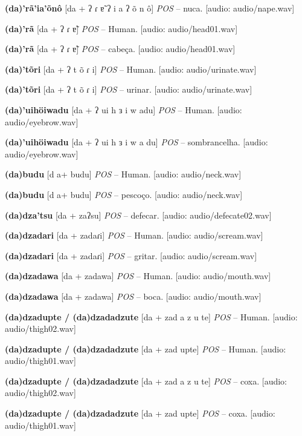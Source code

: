 \textbf{(da)'rã'ia'õnô} [da + ʔ ɾ ɐ̃ ʔ i a ʔ õ n ô] \textit{POS} -- nuca. [audio: audio/nape.wav]{\faHeadphones}

\textbf{(da)'rã} [da + ʔ ɾ ɐ̃] \textit{POS} -- Human. [audio: audio/head01.wav]{\faHeadphones}

\textbf{(da)'rã} [da + ʔ ɾ ɐ̃] \textit{POS} -- cabeça. [audio: audio/head01.wav]{\faHeadphones}

\textbf{(da)'tõri} [da + ʔ t õ ɾ i] \textit{POS} -- Human. [audio: audio/urinate.wav]{\faHeadphones}

\textbf{(da)'tõri} [da + ʔ t õ ɾ i] \textit{POS} -- urinar. [audio: audio/urinate.wav]{\faHeadphones}

\textbf{(da)'uihöiwadu} [da + ʔ ui h ɜ i w adu] \textit{POS} -- Human. [audio: audio/eyebrow.wav]{\faHeadphones}

\textbf{(da)'uihöiwadu} [da + ʔ ui h ɜ i w a du] \textit{POS} -- sombrancelha. [audio: audio/eyebrow.wav]{\faHeadphones}

\textbf{(da)budu} [d a+  budu] \textit{POS} -- Human. [audio: audio/neck.wav]{\faHeadphones}

\textbf{(da)budu} [d a+  budu] \textit{POS} -- pescoço. [audio: audio/neck.wav]{\faHeadphones}

\textbf{(da)dza'tsu} [da + zaʔsu] \textit{POS} -- defecar. [audio: audio/defecate02.wav]{\faHeadphones}

\textbf{(da)dzadari} [da + zadaɾi] \textit{POS} -- Human. [audio: audio/scream.wav]{\faHeadphones}

\textbf{(da)dzadari} [da + zadaɾi] \textit{POS} -- gritar. [audio: audio/scream.wav]{\faHeadphones}

\textbf{(da)dzadawa} [da + zadawa] \textit{POS} -- Human. [audio: audio/mouth.wav]{\faHeadphones}

\textbf{(da)dzadawa} [da + zadawa] \textit{POS} -- boca. [audio: audio/mouth.wav]{\faHeadphones}

\textbf{(da)dzadupte / (da)dzadadzute } [da + zad a z u te] \textit{POS} -- Human. [audio: audio/thigh02.wav]{\faHeadphones}

\textbf{(da)dzadupte / (da)dzadadzute } [da + zad upte] \textit{POS} -- Human. [audio: audio/thigh01.wav]{\faHeadphones}

\textbf{(da)dzadupte / (da)dzadadzute } [da + zad a z u te] \textit{POS} -- coxa. [audio: audio/thigh02.wav]{\faHeadphones}

\textbf{(da)dzadupte / (da)dzadadzute } [da + zad upte] \textit{POS} -- coxa. [audio: audio/thigh01.wav]{\faHeadphones}

